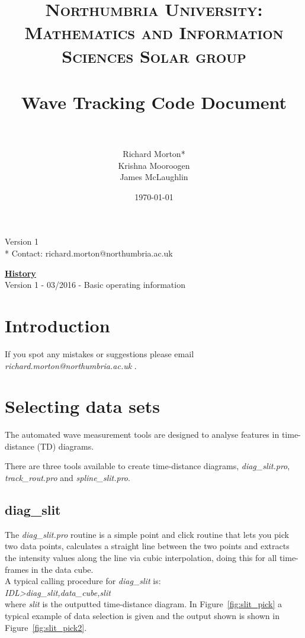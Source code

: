\documentclass{article}
\title{	
\normalfont \normalsize 
\textsc{Northumbria University: Mathematics and Information Sciences Solar group} \\ [25pt] %
\horrule{0.5pt} \\[0.4cm] %
\huge Wave Tracking Code Document \\ %
\horrule{2pt} \\[0.5cm] %
}
\author{Richard Morton*\\ Krishna Mooroogen\\ James McLaughlin} %
\date{\normalsize\today} %
\begin{document}
\maketitle %

\vspace{10cm}

\begin{center}
{Version 1}\\
* Contact: richard.morton@northumbria.ac.uk 
\end{center}

\newpage
\underline{\textbf{History}}\\

Version 1 - 03/2016 - Basic operating information 
\newpage
\section{Introduction}


If you spot any mistakes or suggestions please email \textit{richard.morton@northumbria.ac.uk} .

\section{Selecting data sets}
The automated wave measurement tools are designed to analyse features in time-distance (TD) diagrams.

There are three tools available to create time-distance diagrams, \textit{diag\_slit.pro}, \textit{track\_rout.pro} and \textit{spline\_slit.pro}. 

\subsection{diag\_slit}
The \textit{diag\_slit.pro} routine is a simple point and click routine that lets you pick two data points, calculates a straight line between the
two points and extracts the intensity values along the line via cubic interpolation, doing this for all time-frames in the
data cube. \\

A typical calling procedure for \textit{diag\_slit} is:\\

\textit{IDL\textgreater diag\_slit,data\_cube,slit}\\
 
where \textit{slit} is the outputted time-distance diagram. In Figure~\ref{fig:slit_pick} a typical example of data selection is given and the output shown is shown in Figure~\ref{fig:slit_pick2}.
\end{document}
